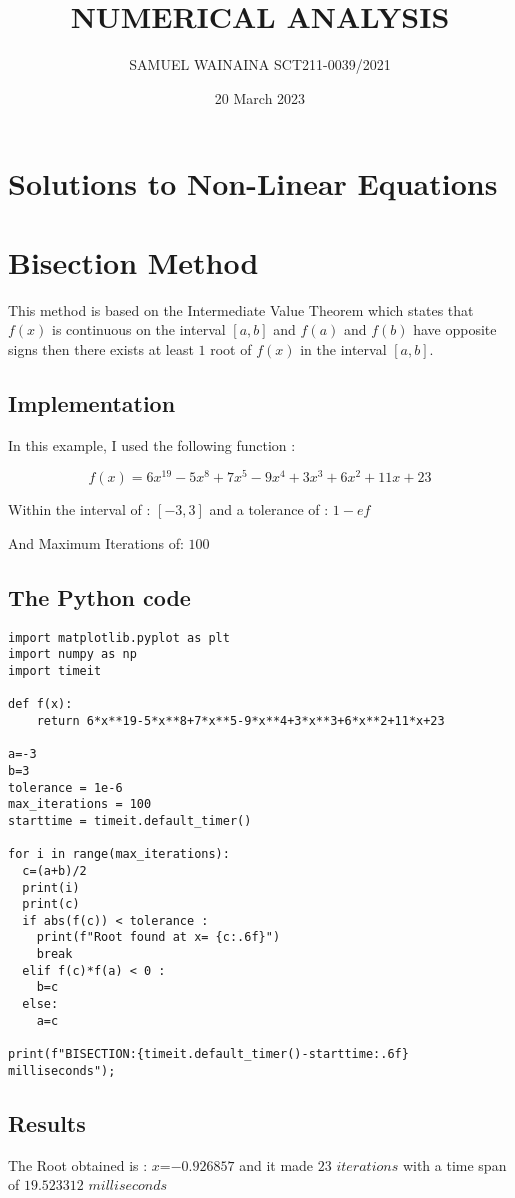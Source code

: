 \documentclass{article}
\title{NUMERICAL ANALYSIS}
\author{SAMUEL WAINAINA SCT211-0039/2021}
\date{20 March 2023}
\begin{document}
\section*{Solutions to Non-Linear Equations}
\section{Bisection Method}
This method is based on the Intermediate Value Theorem which states that ${f(x)}$ is continuous on the interval ${[a,b]}$ and ${f(a)}$ and ${f(b)}$ have opposite signs then there exists at least ${1}$ root of ${f(x)}$ in the interval ${[a,b]}$.
\subsection*{Implementation}
In this example, I used the following function :


\begin{equation}
    f(x)= 6x^{19}-5x^8+7x^5-9x^4+3x^3+6x^2+11x+23
\end{equation}

Within the interval of : ${[-3,3]}$ and  a tolerance of : ${1-ef}$ 

And Maximum Iterations of: ${100}$

\subsection*{The Python code} \lstset{language=Python}
\begin{verbatim}
import matplotlib.pyplot as plt
import numpy as np
import timeit 

def f(x):
    return 6*x**19-5*x**8+7*x**5-9*x**4+3*x**3+6*x**2+11*x+23

a=-3
b=3
tolerance = 1e-6
max_iterations = 100
starttime = timeit.default_timer()

for i in range(max_iterations):
  c=(a+b)/2
  print(i)
  print(c)
  if abs(f(c)) < tolerance : 
    print(f"Root found at x= {c:.6f}")
    break
  elif f(c)*f(a) < 0 :
    b=c
  else:
    a=c

print(f"BISECTION:{timeit.default_timer()-starttime:.6f} milliseconds");

    \end{verbatim}
\subsection*{Results}
The Root obtained is : ${x}$=${-0.926857}$ and it made ${23}$ ${iterations}$ with a time span of ${19.523312}$ ${ milliseconds}$
\end{document}

